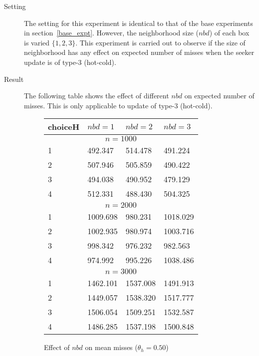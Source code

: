 \documentclass[11pt,a4paper,draft]{article}
\begin{document}
\begin{description}
	\item[Setting] The setting for this experiment is identical to that of the base experiments in section~\ref{base_expt}. However, the neighborhood size ($nbd$) of each box is varied $\{1,2,3\}$. This experiment is carried out to observe if the size of neighborhood has any effect on expected number of misses when the seeker update is of type-3 (hot-cold).
	
	\item[Result] The following table shows the effect of different $nbd$ on expected number of misses. This is only applicable to update of type-3 (hot-cold).
	\begin{figure}[!h]
		\centering
		\begin{tabular}{llll}
			\hline \hline
			choiceH & $nbd = 1$ & $nbd = 2$ & $nbd = 3$ \\
			\hline \hline 
			\multicolumn{4}{c}{$n = 1000$} \\ 
			\hline
			1 & 492.347 & 514.478 & 491.224 \\
			2 & 507.946 & 505.859 & 490.422 \\
			3 & 494.038 & 490.952 & 479.129 \\
			4 & 512.331 & 488.430 & 504.325 \\
			\hline
			\multicolumn{4}{c}{$n = 2000$} \\ 
			\hline
			1 & 1009.698 & 980.231 & 1018.029 \\
			2 & 1002.935 & 980.974 & 1003.716 \\
			3 & 998.342 & 976.232 & 982.563 \\
			4 & 974.992 & 995.226 & 1038.486 \\
			\hline
			\multicolumn{4}{c}{$n = 3000$} \\
			\hline
			1 & 1462.101 & 1537.008 & 1491.913 \\
			2 & 1449.057 & 1538.320 & 1517.777 \\
			3 & 1506.054 & 1509.251 & 1532.587 \\
			4 & 1486.285 & 1537.198 & 1500.848 \\
			\hline 
		\end{tabular}
		\caption{Effect of $nbd$ on mean misses ($\theta_h = 0.50$)}
	\end{figure}


\end{description}
\end{document}
